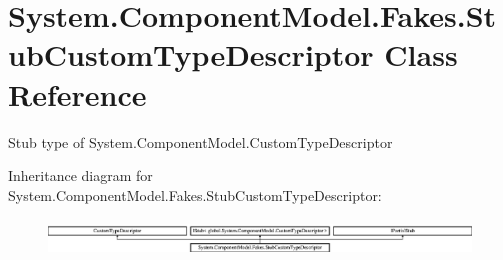 \hypertarget{class_system_1_1_component_model_1_1_fakes_1_1_stub_custom_type_descriptor}{\section{System.\-Component\-Model.\-Fakes.\-Stub\-Custom\-Type\-Descriptor Class Reference}
\label{class_system_1_1_component_model_1_1_fakes_1_1_stub_custom_type_descriptor}
}


Stub type of System.\-Component\-Model.\-Custom\-Type\-Descriptor 


Inheritance diagram for System.\-Component\-Model.\-Fakes.\-Stub\-Custom\-Type\-Descriptor\-:\begin{figure}[H]
\begin{center}
\leavevmode
\includegraphics[height=0.972222cm]{class_system_1_1_component_model_1_1_fakes_1_1_stub_custom_type_descriptor}
\end{center}
\end{figure}

